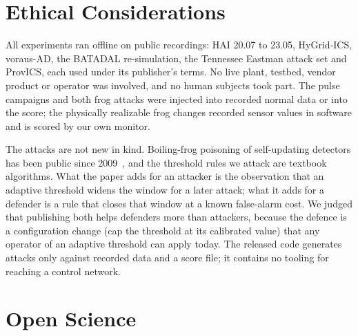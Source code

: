 \documentclass[letterpaper,twocolumn,10pt]{article}
\begin{document}



\appendix

\section*{Ethical Considerations}

All experiments ran offline on public recordings: HAI 20.07 to 23.05, HyGrid-ICS, voraus-AD, the
BATADAL re-simulation, the Tennessee Eastman attack set and ProvICS, each used under its publisher's
terms. No live plant, testbed, vendor product
or operator was involved, and no human subjects took part. The pulse campaigns and both frog attacks
were injected into recorded normal data or into the score; the physically realizable frog changes
recorded sensor values in software and is scored by our own monitor.

The attacks are not new in kind. Boiling-frog poisoning of self-updating detectors has been public
since 2009~\cite{chantin2009frog, rubinstein2009antidote}, and the threshold rules we attack are
textbook algorithms. What the paper adds for an attacker is the observation that an adaptive
threshold widens the window for a later attack; what it adds for a defender is a rule that closes
that window at a known false-alarm cost. We judged that publishing both helps defenders more than
attackers, because the defence is a configuration change (cap the threshold at its calibrated value)
that any operator of an adaptive threshold can apply today. The released code generates attacks only
against recorded data and a score file; it contains no tooling for reaching a control network.

\section*{Open Science}
\end{document}
